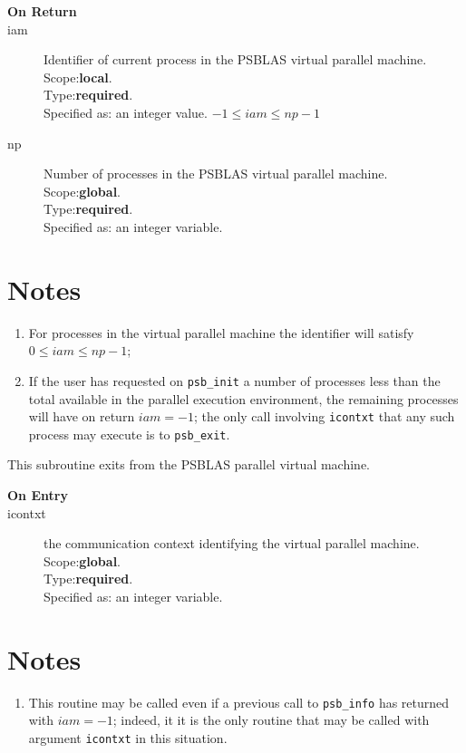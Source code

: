 \begin{description}
\item[\bf On Return]
\item[iam] Identifier of current  process in the PSBLAS virtual parallel machine.\\
Scope:{\bf local}.\\
Type:{\bf required}.\\
Specified as: an integer value. $-1 \le iam \le np-1$\
\item[np] Number of processes in the PSBLAS virtual parallel machine.\\
Scope:{\bf global}.\\
Type:{\bf required}.\\
Specified as: an integer variable. \
\end{description}


\section*{Notes}
\begin{enumerate}
\item For processes in the virtual parallel machine  the identifier
  will satisfy $0 \le iam \le np-1$;
\item If the user has requested on \verb|psb_init| a number of
  processes less than the total available in the parallel execution
  environment, the remaining processes will have on return $iam=-1$;
  the only call involving \verb|icontxt| that any such process may
  execute is  to \verb|psb_exit|. 
\end{enumerate}




This subroutine exits from the  PSBLAS parallel virtual  machine.
\begin{description}
\item[\bf  On Entry ]
\item[icontxt] the communication context identifying the virtual
  parallel machine.\\
Scope:{\bf global}.\\
Type:{\bf required}.\\
Specified as: an integer variable.
\end{description}

\section*{Notes}
\begin{enumerate}
\item This routine may be called even if a previous call to
  \verb|psb_info| has returned with $iam=-1$; indeed, it it is the only
  routine that may be called with argument \verb|icontxt| in this situation.
\end{enumerate}


